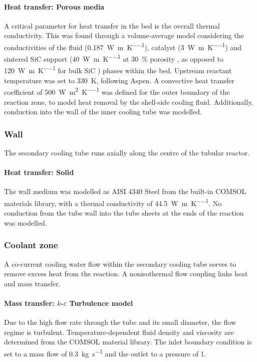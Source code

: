 \paragraph{Heat transfer: Porous media}
A critical parameter for heat transfer in the bed is the overall thermal conductivity. This was found through a volume-average model considering the conductivities of the fluid (\SI{0.187}{\W\per\m\per\K}), catalyst (\SI{3}{\W\per\m\per\K}) and sintered SiC support (\SI{40}{\W\per\m\per\K} at \SI{30}{\percent} porosity \cite{jang_thermophysical_2007}, as opposed to \SI{120}{\W\per\m\per\K} for bulk SiC \cite{accuratus_silicon_2013}) phases within the bed. Upstream reactant temperature was set to \SI{330}{\K}, following Aspen. A convective heat transfer coefficient of \SI{500}{\W\per\square\m\per\K} was defined for the outer boundary of the reaction zone, to model heat removal by the shell-side cooling fluid. Additionally, conduction into the wall of the inner cooling tube was modelled.

\subsubsection{Wall}

The secondary cooling tube runs axially along the centre of the tubular reactor.

\paragraph{Heat transfer: Solid}
The wall medium was modelled as AISI 4340 Steel from the built-in COMSOL materials library, with a thermal conductivity of \SI{44.5}{\W\per\m\per\K}. No conduction from the tube wall into the tube sheets at the ends of the reaction was modelled.

\subsubsection{Coolant zone}

A co-current cooling water flow within the secondary cooling tube serves to remove excess heat from the reaction. A nonisothermal flow coupling links heat and mass transfer.

\paragraph{Mass transfer: $k$-$\varepsilon$ Turbulence model}
Due to the high flow rate through the tube and its small diameter, the flow regime is turbulent. Temperature-dependent fluid density and viscosity are determined from the COMSOL material library. The inlet boundary condition is set to a mass flow of \SI{0.3}{\kg\per\s} and the outlet to a pressure of \SI{1}{\atm}.

